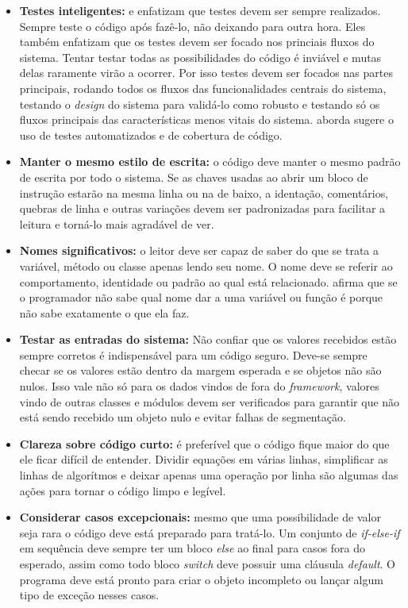 \begin{itemize}
  \item \textbf{Testes inteligentes:} \cite{Goodliffe2007} e \cite{McConnel2004} enfatizam que testes devem ser sempre realizados. Sempre teste o código após fazê-lo, não deixando para outra hora. Eles também enfatizam que os testes devem ser focado nos princiais fluxos do sistema. Tentar testar todas as possibilidades do código é inviável e mutas delas raramente virão a ocorrer. Por isso testes devem ser focados nas partes principais, rodando todos os fluxos das funcionalidades centrais do sistema, testando o \textit{design} do sistema para validá-lo como robusto e testando só os fluxos principais das características menos vitais do sistema. \cite{McConnel2004} aborda sugere o uso de testes automatizados e de cobertura de código.
  \item \textbf{Manter o mesmo estilo de escrita:} o código deve manter o mesmo padrão de escrita por todo o sistema. Se as chaves usadas ao abrir um bloco de instrução estarão na mesma linha ou na de baixo, a identação, comentários, quebras de linha e outras variações devem ser padronizadas para facilitar a leitura e torná-lo mais agradável de ver.
  \item \textbf{Nomes significativos:} o leitor deve ser capaz de saber do que se trata a variável, método ou classe apenas lendo seu nome. O nome deve se referir ao comportamento, identidade ou padrão ao qual está relacionado. \cite{Goodliffe2007} afirma que se o programador não sabe qual nome dar a uma variável ou função é porque não sabe exatamente o que ela faz.
  \item \textbf{Testar as entradas do sistema:} Não confiar que os valores recebidos estão sempre corretos é indispensável para um código seguro. Deve-se sempre checar se os valores estão dentro da margem esperada e se objetos não são nulos. Isso vale não só para os dados vindos de fora do \textit{framework}, valores vindo de outras classes e módulos devem ser verificados para garantir que não está sendo recebido um objeto nulo e evitar falhas de segmentação.
  \item \textbf{Clareza sobre código curto:} é preferível que o código fique maior do que ele ficar difícil de entender. Dividir equações em várias linhas, simplificar as linhas de algorítmos e deixar apenas uma operação por linha são algumas das ações para tornar o código limpo e legível.
  \item \textbf{Considerar casos excepcionais:} mesmo que uma possibilidade de valor seja rara o código deve está preparado para tratá-lo. Um conjunto de \textit{if-else-if} em sequência deve sempre ter um bloco \textit{else} ao final para casos fora do esperado, assim como todo bloco \textit{switch} deve possuir uma cláusula \textit{default}. O programa deve está pronto para criar o objeto incompleto ou lançar algum tipo de exceção nesses casos.

\end{itemize}
